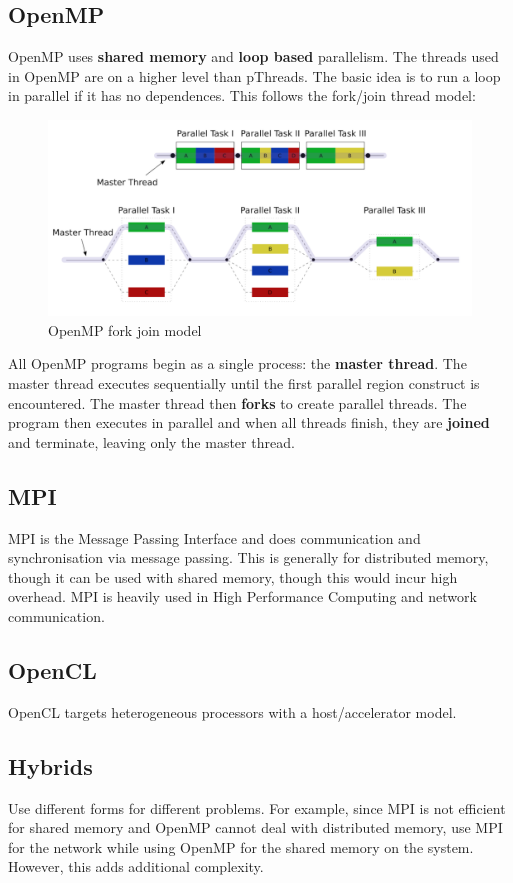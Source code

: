 \documentclass[11pt]{article}
\begin{document}
\subsection{OpenMP}
OpenMP uses \textbf{shared memory} and \textbf{loop based} parallelism. The threads used in OpenMP are on a higher level than pThreads. The basic idea is to run a loop in parallel if it has no dependences. This follows the fork/join thread model:
\begin{figure}[H]
\centering
\includegraphics[width=1\textwidth, keepaspectratio]{imgs/fork-join-model.png}
\caption{OpenMP fork join model}
\end{figure}
\noindent
All OpenMP programs begin as a single process: the \textbf{master thread}. The master thread executes sequentially until the first parallel region construct is encountered. The master thread then \textbf{forks} to create parallel threads. The program then executes in parallel and when all threads finish, they are \textbf{joined} and terminate, leaving only the master thread.

\subsection{MPI}
MPI is the Message Passing Interface and does communication and synchronisation via message passing. This is generally for distributed memory, though it can be used with shared memory, though this would incur high overhead. 
\n
MPI is heavily used in High Performance Computing and network communication. 

\subsection{OpenCL}
OpenCL targets heterogeneous processors with a host/accelerator model. 

\subsection{Hybrids}
Use different forms for different problems. For example, since MPI is not efficient for shared memory and OpenMP cannot deal with distributed memory, use MPI for the network while using OpenMP for the shared memory on the system. However, this adds additional complexity. 
\end{document}
